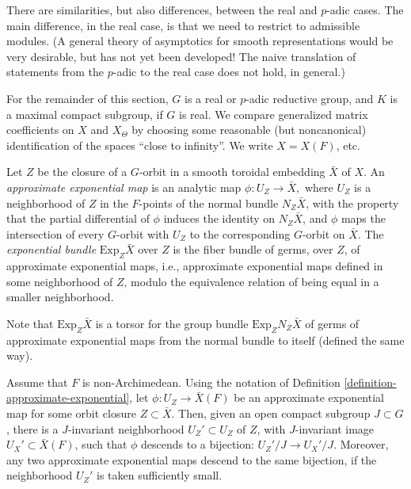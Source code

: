There are similarities, but also differences, between the real and $p$-adic cases. The main difference, in the real case, is that we need to restrict to admissible modules. (A general theory of asymptotics for smooth representations would be very desirable, but has not yet been developed! The naive translation of statements from the $p$-adic to the real case does not hold, in general.)

For the remainder of this section, $G$ is a real or $p$-adic reductive group, and $K$ is a maximal compact subgroup, if $G$ is real. We compare generalized matrix coefficients on $X$ and $X_\Theta$ by choosing some reasonable (but noncanonical) identification of the spaces ``close to infinity''. We write $X=X(F)$, etc.

\begin{definition}
 \label{definition-approximate-exponential}
Let $Z$ be the closure of a $G$-orbit in a smooth toroidal embedding $\bar X$ of $X$. An {\it approximate exponential map} is an analytic map $\phi: U_Z\to \bar X,$ where $U_Z$ is a neighborhood of $Z$ in the $F$-points of the normal bundle $N_Z \bar X$,  with the property that the partial differential of $\phi$ induces the identity on $N_Z \bar X$, and $\phi$ maps the intersection of every $G$-orbit with $U_Z$ to the corresponding $G$-orbit on $\bar X$. The {\it exponential bundle} $\text{Exp}_Z \bar X$ over $Z$ is the fiber bundle of germs, over $Z$, of approximate exponential maps, i.e., approximate exponential maps defined in some neighborhood of $Z$, modulo the equivalence relation of being equal in a smaller neighborhood. 
\end{definition}

Note that $\text{Exp}_Z \bar X$ is a torsor for the group bundle $\text{Exp}_Z N_Z\bar X$ of germs of approximate exponential maps from the normal bundle to itself (defined the same way). 

\begin{proposition}
 \label{proposition-exponential-p-adic}
Assume that $F$ is non-Archimedean. Using the notation of Definition \ref{definition-approximate-exponential}, let $\phi: U_Z \to \bar X(F)$ be an approximate exponential map for some orbit closure $Z\subset \bar X$.  
Then, given an open compact subgroup $J\subset G$, there is a $J$-invariant neighborhood $U_Z'\subset U_Z$ of $Z$, with $J$-invariant image $U_X'\subset \bar X(F)$, such that $\phi$ descends to a bijection: $U_Z'/J\to U_X'/J$. Moreover, any two approximate exponential maps descend to the same bijection, if the neighborhood $U_Z'$ is taken sufficiently small.
\end{proposition}

